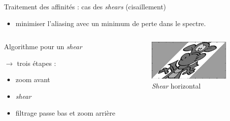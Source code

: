 \documentclass[c,12pt]{beamer}
\newcommand{\ra}[0]{\rightarrow}
\begin{document}
\begin{frame}{Traitement des affinités : cas des \emph{shears} (cisaillement)}

\begin{itemize}
\item minimiser l'aliasing avec un minimum de perte dans le spectre.
\end{itemize}

\begin{columns}
\begin{column}{5cm}

\begin{block}{Algorithme pour un \emph{shear}}

$\ra$ trois étapes :

\begin{itemize}
\item zoom avant
\item \emph{shear}
\item filtrage passe bas et zoom arrière
\end{itemize}

\end{block}
  
 \end{column}

\begin{column}{5cm}

\begin{figure}
\centering
\includegraphics[width=4cm]{dragonshear.jpg}
\caption{\emph{Shear} horizontal}
\end{figure}

\end{column}
\end{columns}
\end{frame}
\end{document}
